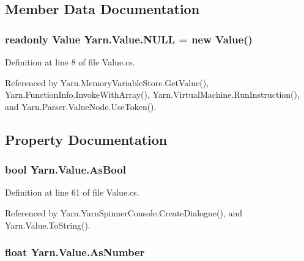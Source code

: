 \subsection{Member Data Documentation}
\hypertarget{a00177_a1ed2964965baca8621c45efa23f37660}{
\subsubsection[{N\-U\-L\-L}]{\setlength{\rightskip}{0pt plus 5cm}readonly {\bf Value} Yarn.\-Value.\-N\-U\-L\-L = new {\bf Value}()\hspace{0.3cm}{\ttfamily [static]}}}\label{a00177_a1ed2964965baca8621c45efa23f37660}


Definition at line 8 of file Value.\-cs.



Referenced by Yarn.\-Memory\-Variable\-Store.\-Get\-Value(), Yarn.\-Function\-Info.\-Invoke\-With\-Array(), Yarn.\-Virtual\-Machine.\-Run\-Instruction(), and Yarn.\-Parser.\-Value\-Node.\-Use\-Token().



\subsection{Property Documentation}
\hypertarget{a00177_a5805faef3b3d376090ff096d6dd6c064}{
\subsubsection[{As\-Bool}]{\setlength{\rightskip}{0pt plus 5cm}bool Yarn.\-Value.\-As\-Bool\hspace{0.3cm}{\ttfamily [get]}}}\label{a00177_a5805faef3b3d376090ff096d6dd6c064}


Definition at line 61 of file Value.\-cs.



Referenced by Yarn.\-Yarn\-Spinner\-Console.\-Create\-Dialogue(), and Yarn.\-Value.\-To\-String().

\hypertarget{a00177_a751419743761562bf902246d6e6a3c0a}{
\subsubsection[{As\-Number}]{\setlength{\rightskip}{0pt plus 5cm}float Yarn.\-Value.\-As\-Number\hspace{0.3cm}{\ttfamily [get]}}}\label{a00177_a751419743761562bf902246d6e6a3c0a}


